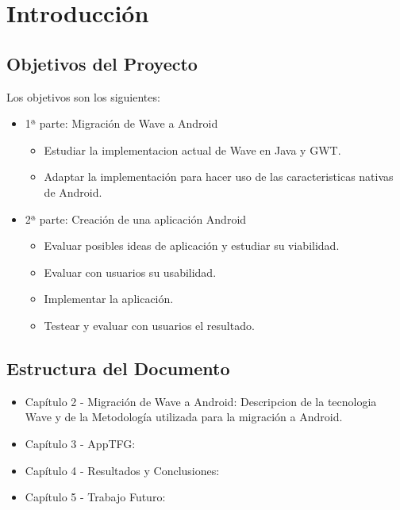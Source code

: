 \newpage
\thispagestyle{sectioned}
\chapter{Introducción}


\section{Objetivos del Proyecto}
Los objetivos son los siguientes:\\[.2cm]

\begin{itemize}
  \item {
    1ª parte: Migración de Wave a Android
    \begin{itemize}
      \item Estudiar la implementacion actual de Wave en Java y GWT.
      \item Adaptar la implementación para hacer uso de las caracteristicas nativas de Android.
    \end{itemize}
  }
  \item {
    2ª parte: Creación de una aplicación Android
    \begin{itemize}
      \item Evaluar posibles ideas de aplicación y estudiar su viabilidad.
      \item Evaluar con usuarios su usabilidad.
      \item Implementar la aplicación.
      \item Testear y evaluar con usuarios el resultado.
    \end{itemize}
  }
\end{itemize}

\section{Estructura del Documento}

\begin{itemize}
  \item Capítulo 2 - Migración de Wave a Android: Descripcion de la tecnologia Wave y de la Metodología utilizada para la migración a Android.
  \item Capítulo 3 - AppTFG:
  \item Capítulo 4 - Resultados y Conclusiones:
  \item Capítulo 5 - Trabajo Futuro:
\end{itemize}
